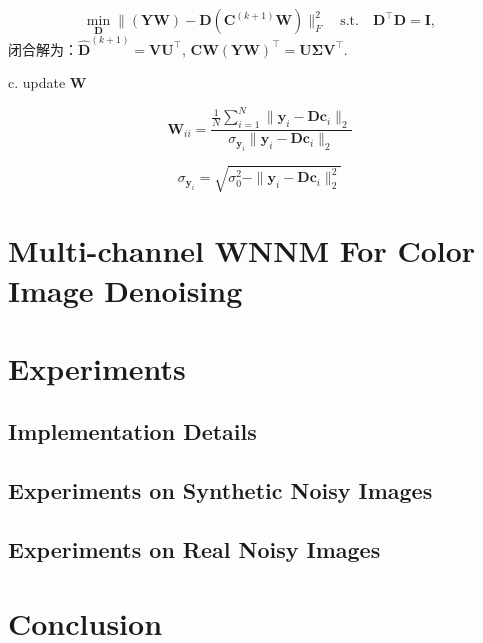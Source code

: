 \documentclass[10pt,twocolumn,letterpaper]{article}
\begin{document}
\begin{equation}
\min_{\mathbf{D}}\|(\mathbf{Y}\mathbf{W})-\mathbf{D}(\mathbf{C}^{(k+1)}\mathbf{W})\|_{F}^{2}
\quad
\text{s.t.}
\quad
\mathbf{D}^{\top}\mathbf{D} = \mathbf{I},
\end{equation}
闭合解为：$\hat{\mathbf{D}}^{(k+1)}=\mathbf{V}\mathbf{U}^{\top}$, $\mathbf{C}\mathbf{W}(\mathbf{Y}\mathbf{W})^{\top}=\mathbf{U}\mathbf{\Sigma}\mathbf{V}^{\top}$.

c. update $\mathbf{W}$

\begin{equation}
\mathbf{W}_{ii} 
=\frac{\frac{1}{N}\sum_{i=1}^{N}\|\mathbf{y}_{i}-\mathbf{D}\mathbf{c}_{i}\|_{2}}{\sigma_{\mathbf{y}_{i}}\|\mathbf{y}_{i}-\mathbf{D}\mathbf{c}_{i}\|_{2}}
\end{equation}


\begin{equation}
\sigma_{\mathbf{y}_{i}} = \sqrt{\sigma_{0}^{2} - \|\mathbf{y}_{i}-\mathbf{D}\mathbf{c}_{i}\|_{2}^{2}}
\end{equation}



\section{Multi-channel WNNM For Color Image Denoising}


\section{Experiments}


\subsection{Implementation Details}


\subsection{Experiments on Synthetic Noisy Images}



\subsection{Experiments on Real Noisy Images}



\section{Conclusion}



{
\small


}
\end{document}
